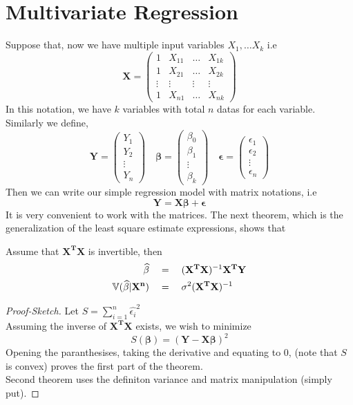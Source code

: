 \section{Multivariate Regression}
Suppose that, now we have multiple input variables $X_1, \ldots X_k$ i.e 
\[\mathbf{X} = 
    \begin{pmatrix}
        1 &X_{11} &\ldots &X_{1k} \\
        1 &X_{21} &\ldots &X_{2k} \\
        \vdots &\vdots &\vdots &\vdots \\
        1 &X_{n1} &\ldots &X_{nk}
    \end{pmatrix}\]
    In this notation, we have $k$ variables with total $n$ datas for each variable. Similarly we define,
    \[
        \mathbf{Y} =
        \begin{pmatrix}
            Y_1 \\
            Y_2 \\
            \vdots \\
            Y_n
        \end{pmatrix}
        \quad 
        \mathbf{\beta} = 
        \begin{pmatrix}
            \beta_0 \\
            \beta_1 \\
            \vdots \\
            \beta_k
        \end{pmatrix}
        \quad
        \mathbf{\epsilon} = 
        \begin{pmatrix}
            \epsilon_1 \\
            \epsilon_2 \\
            \vdots \\
            \epsilon_n
        \end{pmatrix}
    \]
    Then we can write our simple regression model with matrix notations, i.e
    \[\mathbf{Y} = \mathbf{ X\beta} + \mathbf{\epsilon} \]
    It is very convenient to work with the matrices. The next theorem, which is the generalization of the least square estimate expressions, shows that
    \begin{theorem}
        Assume that $\mathbf{X^TX}$ is invertible, then
        \begin{align*}
            \mathbf{\widehat{\beta}} \quad &  = \quad (\mathbf{X^TX})^{-1}\mathbf{X^TY} \\
            {\mathbb{V}}(\mathbf{\widehat{\beta}} | \mathbf{X^n}) \quad &  = \quad \sigma^2(\mathbf{X^TX})^{-1}
        \end{align*}
        \begin{proof}[Proof-Sketch]
            Let $S = \sum_{i=1}^n \widehat{\epsilon_i}^2$ \\
            Assuming the inverse of $\mathbf{X^TX}$ exists, we wish to minimize
            \[ S( \mathbf{\beta}) = \left( \mathbf{Y} - \mathbf{X\beta} \right)^2\]
            Opening the paranthesises, taking the derivative and equating to $0$, (note that $S$ is convex) proves the first part of the theorem. \\
            Second theorem uses the definiton variance and matrix manipulation (simply put).
        \end{proof}
    \end{theorem}
